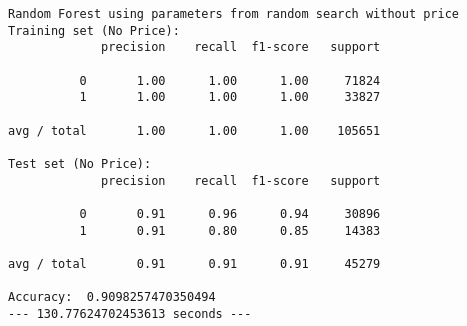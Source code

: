 \documentclass[11pt]{article}
\begin{document}
    \begin{Verbatim}[commandchars=\\\{\}]
Random Forest using parameters from random search without price
Training set (No Price):
             precision    recall  f1-score   support

          0       1.00      1.00      1.00     71824
          1       1.00      1.00      1.00     33827

avg / total       1.00      1.00      1.00    105651

Test set (No Price):
             precision    recall  f1-score   support

          0       0.91      0.96      0.94     30896
          1       0.91      0.80      0.85     14383

avg / total       0.91      0.91      0.91     45279

Accuracy:  0.9098257470350494
--- 130.77624702453613 seconds ---

    \end{Verbatim}
\end{document}
